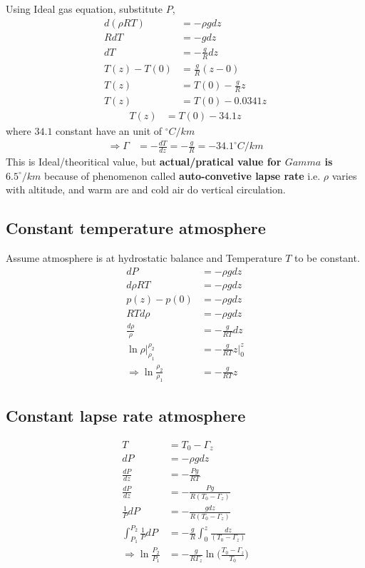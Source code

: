 \documentclass[fleqn,10pt]{SelfArx} %
\begin{document}
Using Ideal gas equation, substitute $P$,
\begin{align}
    d(\rho RT) &= -\rho gdz \\ 
    RdT &= -gdz \\ 
    dT &= -\frac{g}{R}dz \\ 
    T(z) - T(0) &= \frac{g}{R}(z-0) \\
    T(z) &= T(0) - \frac{g}{R}z \\
    T(z) &= T(0) - 0.0341z
\end{align}
\begin{align}
    T(z) &= T(0) - 34.1z
\end{align}
where $34.1$ constant have an unit of $^\circ C/km$
\begin{align}
    \Rightarrow \Gamma &= -\frac{dT}{dz} = -\frac{g}{R} = -34.1^\circ C/km 
\end{align}
This is Ideal/theoritical value, but \textbf{actual/pratical value for $Gamma$ is $6.5^\circ/km$} because of phenomenon called \textbf{auto-convetive lapse rate} i.e. $\rho$ varies with altitude, and warm are and cold air do vertical circulation.

\subsection{Constant temperature atmosphere}
Assume atmosphere is at hydrostatic balance and Temperature $T$ to be constant.
\begin{align}
    dP &= -\rho gdz \\ 
    d \rho R T &= -\rho g dz \\
    p(z)-p(0) &= -\rho gdz \\
    RTd\rho &= -\rho gdz \\
    \frac{d\rho}{\rho} &= -\frac{g}{RT}dz \\
    \ln{\rho} |^{\rho_2}_{\rho_1} &= -\frac{g}{RT}z |^{z}_{0} \\
    \Rightarrow \ln{\frac{\rho_2}{\rho_1}} &= -\frac{g}{RT}z
\end{align}

\subsection{Constant lapse rate atmosphere}
\begin{align}
    T &= T_0-\Gamma_z \\
    dP &= -\rho gdz \\ 
    \frac{dP}{dz} &= -\frac{Pg}{R T} \\ 
    \frac{dP}{dz} &= -\frac{Pg}{R (T_0-\Gamma_z)} \\ 
    \frac{1}{P}dP &= -\frac{gdz}{R (T_0-\Gamma_z)}\\ 
    \int_{P_1}^{P_2}\frac{1}{P}dP &= -\frac{g}{R} \int^z_0 \frac{dz}{(T_0-\Gamma_z)}\\ 
    \Rightarrow \ln{\frac{P_2}{P_1}} &= -\frac{g}{R\Gamma_z} \ln{\Big(\frac{T_0-\Gamma_z}{T_0}\Big)}
\end{align}
\end{document}
